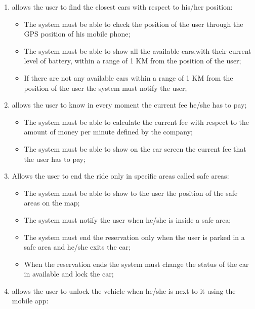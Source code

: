 \begin{enumerate}
\item allows the user to find the closest cars with respect to his/her position:

\begin{itemize}
\item The system must be able to check the position of the user through the GPS position of his mobile phone;
\item The system must be able to show all the available cars,with their current level of battery, within a range of 1 KM from the position of the user;
\item If there are not any available cars within a range of 1 KM from the position of the user the system must notify the user;
\end{itemize}

\item allows the user to know in every moment the current fee he/she has to pay;

\begin{itemize}
\item The system must be able to calculate the current fee with respect to the amount of money per minute defined by the company;
\item The system must be able to show on the car screen the current fee that the user has to pay;
\end{itemize}

\item Allows the user to end the ride only in specific areas called safe areas:

\begin{itemize}
\item The system must be able to show to the user the position of the safe areas on the map;
\item The system must notify the user when he/she is inside a safe area;
\item The system must end the reservation only when the user is parked in a safe area and he/she exits the car;
\item When the reservation ends the system must change the status of the car in available and lock the car;
\end{itemize}

\item allows the user to unlock the vehicle when he/she is next to it using the mobile app:


\end{enumerate}
